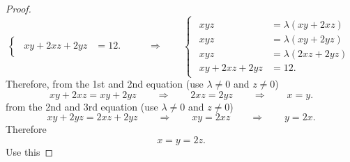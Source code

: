 \begin{proof}
\begin{equation*}
\begin{cases}
\begin{aligned}
        xy + 2xz + 2yz &= 12.
    \end{aligned}
    \end{cases} \qquad\Longrightarrow\qquad 
    \begin{cases}
        \begin{aligned}
            xyz &= \lambda (xy + 2xz)\\
            xyz &= \lambda (xy + 2yz)\\
            xyz &= \lambda (2xz + 2yz)\\
            xy + 2xz + 2yz &= 12.
        \end{aligned}
    \end{cases}
\end{equation*}
Therefore, from the 1st and 2nd equation (use $\lambda\neq 0$ and $z\neq 0$)
\begin{equation*}
    xy +2xz = xy + 2yz \qquad\Longrightarrow\qquad 2xz=2yz \qquad\Longrightarrow\qquad x=y.
\end{equation*}
from the 2nd and 3rd equation (use $\lambda\neq 0$ and $z\neq 0$)
\begin{equation*}
    xy +2yz = 2xz + 2yz \qquad\Longrightarrow\qquad xy=2xz \qquad\Longrightarrow\qquad y=2x.
\end{equation*}
Therefore 
\begin{equation*}
    x = y = 2z.
\end{equation*}
Use this 
\end{proof}
